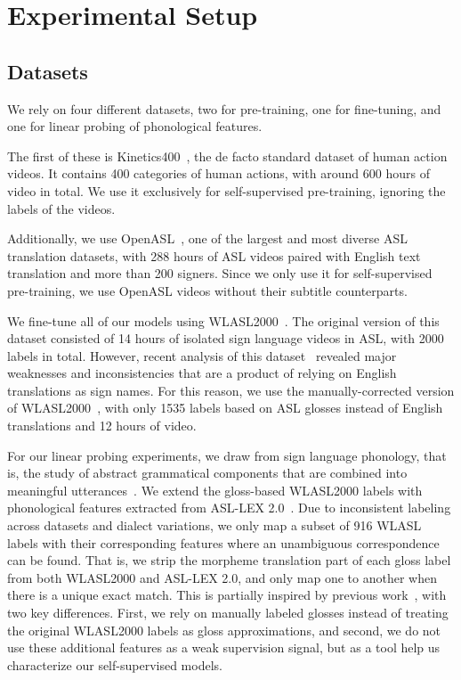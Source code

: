 \section{Experimental Setup}
\label{sec:experimental-setup}

\subsection{Datasets}
\label{sec:experimental-setup-datasets}

We rely on four different datasets, two for pre-training, one for fine-tuning, and one for linear probing of phonological features.

The first of these is Kinetics400~\cite{carreira2017quo}, the de facto standard dataset of human action videos. It contains 400 categories of human actions, with around 600 hours of video in total. We use it exclusively for self-supervised pre-training, ignoring the labels of the videos.

Additionally, we use OpenASL~\cite{Shi2022OpenASL}, one of the largest and most diverse ASL translation datasets, with 288 hours of ASL videos paired with English text translation and more than 200 signers. Since we only use it for self-supervised pre-training, we use OpenASL videos without their subtitle counterparts.

We fine-tune all of our models using WLASL2000~\cite{Li2020WLASL}. The original version of this dataset consisted of 14 hours of isolated sign language videos in ASL, with 2000 labels in total. However, recent analysis of this dataset~\cite{Dafnis2022Bidirectional} revealed major weaknesses and inconsistencies that are a product of relying on English translations as sign names. For this reason, we use the manually-corrected version of WLASL2000~\cite{neidle2022alternative}, with only 1535 labels based on ASL glosses instead of English translations and 12 hours of video.

For our linear probing experiments, we draw from sign language phonology, that is, the study of abstract grammatical components that are combined into meaningful utterances~\cite{brentari2019sign}. We extend the gloss-based WLASL2000 labels with phonological features extracted from ASL-LEX 2.0~\cite{sehyr2021asllex}. Due to inconsistent labeling across datasets and dialect variations, we only map a subset of 916 WLASL labels with their corresponding features where an unambiguous correspondence can be found. That is, we strip the morpheme translation part of each gloss label from both WLASL2000 and ASL-LEX 2.0, and only map one to another when there is a unique exact match. This is partially inspired by previous work~\cite{tavella2022wlasl,kezar2023improving}, with two key differences. First, we rely on manually labeled glosses instead of treating the original WLASL2000 labels as gloss approximations, and second, we do not use these additional features as a weak supervision signal, but as a tool help us characterize our self-supervised models.

